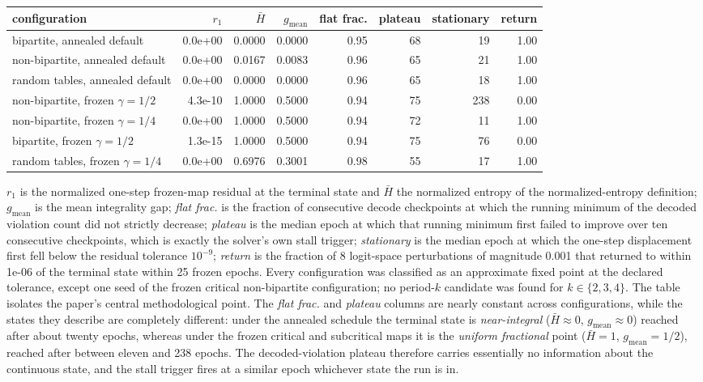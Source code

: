 \begin{table}[htbp]
{\small\begin{tabular}{lrrrrrrr}
\toprule
configuration & $r_1$ & $\bar H$ & $g_{\mathrm{mean}}$ & flat frac. & plateau & stationary & return \\
\midrule
bipartite, annealed default & 0.0e+00 & 0.0000 & 0.0000 & 0.95 & 68 & 19 & 1.00 \\
non-bipartite, annealed default & 0.0e+00 & 0.0167 & 0.0083 & 0.96 & 65 & 21 & 1.00 \\
random tables, annealed default & 0.0e+00 & 0.0000 & 0.0000 & 0.96 & 65 & 18 & 1.00 \\
non-bipartite, frozen $\gamma=1/2$ & 4.3e-10 & 1.0000 & 0.5000 & 0.94 & 75 & 238 & 0.00 \\
non-bipartite, frozen $\gamma=1/4$ & 0.0e+00 & 1.0000 & 0.5000 & 0.94 & 72 & 11 & 1.00 \\
bipartite, frozen $\gamma=1/2$ & 1.3e-15 & 1.0000 & 0.5000 & 0.94 & 75 & 76 & 0.00 \\
random tables, frozen $\gamma=1/4$ & 0.0e+00 & 0.6976 & 0.3001 & 0.98 & 55 & 17 & 1.00 \\
\bottomrule
\end{tabular}}
{$r_1$ is the normalized one-step frozen-map residual at the terminal state and $\bar H$ the normalized entropy of the normalized-entropy definition; $g_{\mathrm{mean}}$ is the mean integrality gap; \emph{flat frac.} is the fraction of consecutive decode checkpoints at which the running minimum of the decoded violation count did not strictly decrease; \emph{plateau} is the median epoch at which that running minimum first failed to improve over ten consecutive checkpoints, which is exactly the solver's own stall trigger; \emph{stationary} is the median epoch at which the one-step displacement first fell below the residual tolerance $10^{-9}$; \emph{return} is the fraction of 8 logit-space perturbations of magnitude 0.001 that returned to within 1e-06 of the terminal state within 25 frozen epochs. Every configuration was classified as an approximate fixed point at the declared tolerance, except one seed of the frozen critical non-bipartite configuration; no period-$k$ candidate was found for $k\in\{2,3,4\}$. The table isolates the paper's central methodological point. The \emph{flat frac.} and \emph{plateau} columns are nearly constant across configurations, while the states they describe are completely different: under the annealed schedule the terminal state is \emph{near-integral} ($\bar H\approx 0$, $g_{\mathrm{mean}}\approx 0$) reached after about twenty epochs, whereas under the frozen critical and subcritical maps it is the \emph{uniform fractional} point ($\bar H=1$, $g_{\mathrm{mean}}=1/2$), reached after between eleven and 238 epochs. The decoded-violation plateau therefore carries essentially no information about the continuous state, and the stall trigger fires at a similar epoch whichever state the run is in.}
\end{table}
